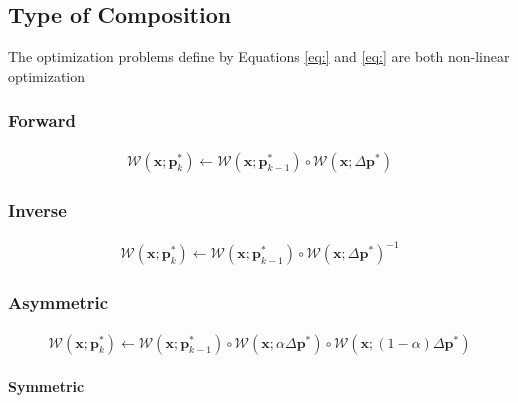 \subsection{Type of Composition}
\label{sec:composition}

The optimization problems define by Equations \ref{eq:} and \ref{eq:} are both non-linear optimization

\subsubsection{Forward}
\label{sec:forward}

\begin{equation}
 	\begin{aligned}
    	\mathcal{W}(\mathbf{x}; \mathbf{p}_k^*) \leftarrow \mathcal{W}(\mathbf{x}; \mathbf{p}_{k-1}^*) \circ \mathcal{W}(\mathbf{x}; \Delta \mathbf{p}^*) 
    \label{eq:fc_update}
    \end{aligned}
\end{equation}


\subsubsection{Inverse}
\label{sec:inverse}

\begin{equation}
 	\begin{aligned}
    	\mathcal{W}(\mathbf{x}; \mathbf{p}_k^*) \leftarrow \mathcal{W}(\mathbf{x}; \mathbf{p}_{k-1}^*) \circ \mathcal{W}(\mathbf{x}; \Delta \mathbf{p}^*)^{-1} 
    \label{eq:ic_update}
    \end{aligned}
\end{equation}

\subsubsection{Asymmetric}
\label{sec:asymmetric}

\begin{equation}
 	\begin{aligned}
    	\mathcal{W}(\mathbf{x}; \mathbf{p}_k^*) \leftarrow \mathcal{W}(\mathbf{x}; \mathbf{p}_{k-1}^*) \circ \mathcal{W}(\mathbf{x}; \alpha \Delta \mathbf{p}^*)\circ \mathcal{W}(\mathbf{x}; (1-\alpha) \Delta \mathbf{p}^*) 
    \label{eq:ac_update}
    \end{aligned}
\end{equation}

\paragraph{Symmetric}
\label{sec:symmetric}

